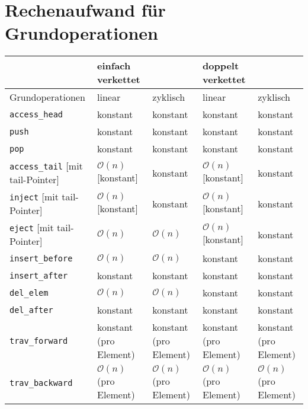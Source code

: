 \section{Rechenaufwand für Grundoperationen}

\begin{longtable}{p{}|p{}p{}|p{}p{}}
	 \rowcolor{lightgray}& einfach verkettet & & doppelt verkettet & \\
	 \hline
	 \rowcolor{lightgray}Grundoperationen & linear & zyklisch & linear & zyklisch \\
	 \hline\hline
	 \texttt{access\_head} & konstant & konstant & konstant & konstant \\
	 \hline
	 \texttt{push} & konstant & konstant & konstant & konstant \\
	 \hline
	 \texttt{pop} & konstant & konstant & konstant & konstant \\
	 \hline
	 \texttt{access\_tail} [mit tail-Pointer] & $\mathcal{O}(n)$ [konstant] & konstant & $\mathcal{O}(n)$ [konstant] & konstant \\
	 \hline
	 \texttt{inject} [mit tail-Pointer] & $\mathcal{O}(n)$ [konstant] & konstant & $\mathcal{O}(n)$ [konstant] & konstant \\
	 \hline
	 \texttt{eject} [mit tail-Pointer] & $\mathcal{O}(n)$ & $\mathcal{O}(n)$ & $\mathcal{O}(n)$ [konstant] & konstant \\
	 \hline
	 \texttt{insert\_before} & $\mathcal{O}(n)$ & $\mathcal{O}(n)$ & konstant & konstant \\
	 \hline
	 \texttt{insert\_after} & konstant & konstant & konstant & konstant \\
	 \hline
	 \texttt{del\_elem} & $\mathcal{O}(n)$ & $\mathcal{O}(n)$ & konstant & konstant \\
	 \hline
	 \texttt{del\_after} & konstant & konstant & konstant & konstant \\
	 \hline
	 \texttt{trav\_forward} & konstant (pro Element) & konstant (pro Element) & konstant (pro Element) & konstant (pro Element) \\
	 \hline
	 \texttt{trav\_backward} & $\mathcal{O}(n)$ (pro Element) & $\mathcal{O}(n)$ (pro Element) & $\mathcal{O}(n)$ (pro Element) & $\mathcal{O}(n)$ (pro Element) \\
\end{longtable}